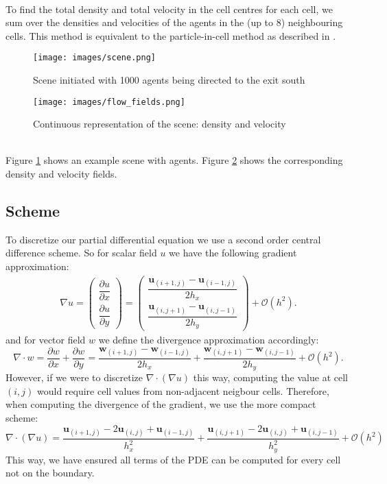 \documentclass{article}
\renewcommand{\vec}[1]{\mathbf{#1}}
\newcommand{\bigo}[1]{\mathcal{O}\left(#1\right)}
\begin{document}
\ \\
To find the total density and total velocity in the cell centres for each cell, we sum over the densities and velocities of the agents in the (up to 8) neighbouring cells. This method is equivalent to the particle-in-cell method as described in \cite{zhu13}.\\
\begin{figure}[h]
	\centering
	\texttt{[image: images/scene.png]}
	\caption{Scene initiated with 1000 agents being directed to the exit south}
	\label{fig:cont_ex_scene}
\end{figure}
\begin{figure}[h]
	\centering
	\texttt{[image: images/flow\_fields.png]}
	\caption{Continuous representation of the scene: density and velocity}
	\label{fig:cont_flow_field}
\end{figure}\\
Figure \ref{fig:cont_ex_scene} shows an example scene with agents. Figure \ref{fig:cont_flow_field} shows the corresponding density and velocity fields.
\subsection{Scheme}
\label{sec:scheme}
To discretize our partial differential equation we use a second order central difference scheme. So for scalar field $u$ we have the following gradient approximation:
\begin{align*}
\nabla u=\begin{pmatrix}\dfrac{\partial u}{\partial x}\\\dfrac{\partial u}{\partial y}\end{pmatrix}
=\begin{pmatrix}\dfrac{\vec{u}_{(i+1,j)}-\vec{u}_{(i-1,j)}}{2h_x}\\\dfrac{\vec{u}_{(i,j+1)}-\vec{u}_{(i,j-1)}}{2h_y}\end{pmatrix}+\bigo{h^2}.
\end{align*}
and for vector field $w$ we define the divergence approximation accordingly:
\begin{equation}
\nabla\cdot w=\dfrac{\partial w}{\partial x}+\dfrac{\partial w}{\partial y}=\dfrac{\vec{w}_{(i+1,j)}-\vec{w}_{(i-1,j)}}{2h_x}+\dfrac{\vec{w}_{(i,j+1)}-\vec{w}_{(i,j-1)}}{2h_y}+\bigo{h^2}.
\end{equation}
However, if we were to discretize $\nabla\cdot(\nabla u)$ this way, computing the value at cell $(i,j)$ would require cell values from non-adjacent neigbour cells. Therefore, when computing the divergence of the gradient, we use the more compact scheme:
\begin{equation*}
\nabla\cdot(\nabla u) = \dfrac{\vec{u}_{(i+1,j)}-2\vec{u}_{(i,j)}+\vec{u}_{(i-1,j)}}{h_x^2}+\dfrac{\vec{u}_{(i,j+1)}-2\vec{u}_{(i,j)}+\vec{u}_{(i,j-1)}}{h_y^2}+\bigo{h^2}
\end{equation*}
This way, we have ensured all terms of the PDE can be computed for every cell not on the boundary.
\end{document}
